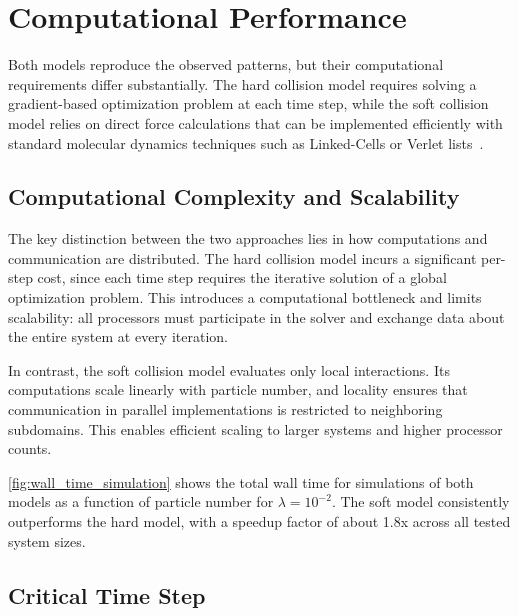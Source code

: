 \documentclass[conference]{IEEEtran}
\begin{document}
\section{Computational Performance}

Both models reproduce the observed patterns, but their computational requirements differ substantially.
The hard collision model requires solving a gradient-based optimization problem at each time step,
while the soft collision model relies on direct force calculations that can be implemented efficiently
with standard molecular dynamics techniques such as Linked-Cells or Verlet lists~\cite{Gratl2019}.

\subsection{Computational Complexity and Scalability}
\label{sec:complexity_scalability}

The key distinction between the two approaches lies in how computations and communication are distributed.
The hard collision model incurs a significant per-step cost, since each time step requires the iterative
solution of a global optimization problem. This introduces a computational bottleneck and limits scalability:
all processors must participate in the solver and exchange data about the entire system at every iteration.

In contrast, the soft collision model evaluates only local interactions. Its computations scale linearly
with particle number, and locality ensures that communication in parallel implementations is restricted
to neighboring subdomains. This enables efficient scaling to larger systems and higher processor counts.

\autoref{fig:wall_time_simulation} shows the total wall time for simulations of both models
as a function of particle number for $\lambda = 10^{-2}$.
The soft model consistently outperforms the hard model, with a speedup factor of about 1.8x across all tested system sizes.








\subsection{Critical Time Step}
\end{document}
